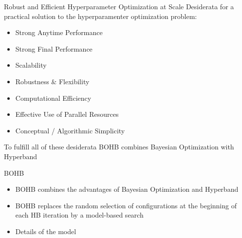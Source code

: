 
\begin{frame}[c]{Robust and Efficient Hyperparameter Optimization at Scale}
Desiderata for a practical solution to the hyperparamenter optimization problem:
\begin{itemize}
    \item Strong Anytime Performance
    \item Strong Final Performance
    \pause
    \item Scalability
    \item Robustness $\&$ Flexibility
    \pause
    \item Computational Efficiency
    \item Effective Use of Parallel Resources
    \pause
    \item Conceptual / Algorithmic Simplicity
    \pause
\end{itemize}
\bigskip
To fulfill all of these desiderata BOHB combines Bayesian Optimization with Hyperband

\end{frame}
\begin{frame}[c]{BOHB}
\begin{itemize}
    \item BOHB combines the advantages of Bayesian Optimization and Hyperband
\pause
\bigskip
    \item BOHB replaces the random selection of configurations at the beginning of each HB iteration by a model-based search
\pause
\bigskip
    \item Details of the model
\end{itemize}

\end{frame}
